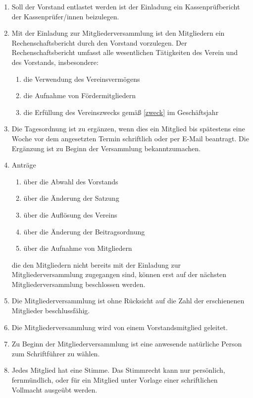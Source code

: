 \documentclass[german]{article}
\begin{document}
\begin{enumerate}
\begin{enumerate}
\item Soll der Vorstand entlastet werden ist der Einladung ein Kassenprüfbericht der Kassenprüfer/innen beizulegen.

\item Mit der Einladung zur Mitgliederversammlung ist den Mitgliedern ein Rechenschaftsbericht durch den Vorstand vorzulegen.
Der Rechenschaftsbericht umfasst alle wesentlichen Tätigkeiten des Verein und des Vorstands, insbesondere:
\begin{enumerate}
\item die Verwendung des Vereinsvermögens
\item die Aufnahme von Fördermitgliedern
\item die Erfüllung des Vereinszwecks gemäß \ref{zweck} im Geschäftsjahr
\end{enumerate}

\item Die Tagesordnung ist zu ergänzen, wenn dies ein Mitglied bis spätestens eine Woche vor dem angesetzten Termin schriftlich oder per E-Mail beantragt.
Die Ergänzung ist zu Beginn der Versammlung bekanntzumachen.

\item Anträge
\begin{enumerate}
\item über die Abwahl des Vorstands
\item über die Änderung der Satzung
\item über die Auflösung des Vereins
\item über die Änderung der Beitragsordnung
\item über die Aufnahme von Mitgliedern
\end{enumerate}
die den Mitgliedern nicht bereits mit der Einladung zur Mitgliederversammlung zugegangen sind, können erst auf der nächsten Mitgliederversammlung beschlossen werden.

\item Die Mitgliederversammlung ist ohne Rücksicht auf die Zahl der erschienenen Mitglieder beschlussfähig.

\item Die Mitgliederversammlung wird von einem Vorstandsmitglied geleitet.

\item Zu Beginn der Mitgliederversammlung ist eine anwesende natürliche Person zum Schriftführer zu wählen.

\item Jedes Mitglied hat eine Stimme. Das Stimmrecht kann nur persönlich, fernmündlich, oder für ein Mitglied unter Vorlage einer schriftlichen Vollmacht ausgeübt werden.


\end{enumerate}
\end{enumerate}
\end{document}
